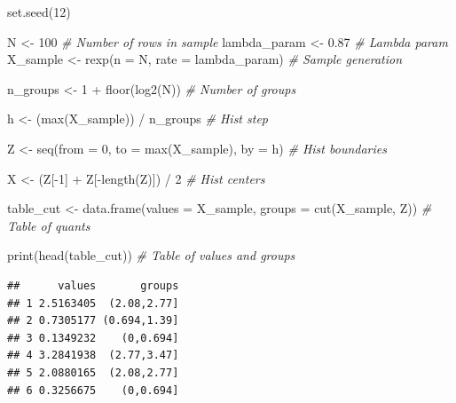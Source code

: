 \documentclass[
  14,
]{article}
\newenvironment{Shaded}{\begin{snugshade}}{\end{snugshade}}
\newcommand{\AttributeTok}[1]{\textcolor[rgb]{0.77,0.63,0.00}{#1}}
\newcommand{\CommentTok}[1]{\textcolor[rgb]{0.56,0.35,0.01}{\textit{#1}}}
\newcommand{\DecValTok}[1]{\textcolor[rgb]{0.00,0.00,0.81}{#1}}
\newcommand{\FloatTok}[1]{\textcolor[rgb]{0.00,0.00,0.81}{#1}}
\newcommand{\FunctionTok}[1]{\textcolor[rgb]{0.00,0.00,0.00}{#1}}
\newcommand{\NormalTok}[1]{#1}
\newcommand{\OtherTok}[1]{\textcolor[rgb]{0.56,0.35,0.01}{#1}}
\newcommand{\SpecialCharTok}[1]{\textcolor[rgb]{0.00,0.00,0.00}{#1}}
\begin{document}
\begin{Shaded}
\begin{Highlighting}[]
\FunctionTok{set.seed}\NormalTok{(}\DecValTok{12}\NormalTok{)}

\NormalTok{N }\OtherTok{\textless{}{-}} \DecValTok{100}                                        \CommentTok{\# Number of rows in sample}
\NormalTok{lambda\_param }\OtherTok{\textless{}{-}} \FloatTok{0.87}                                \CommentTok{\# Lambda param}
\NormalTok{X\_sample }\OtherTok{\textless{}{-}} \FunctionTok{rexp}\NormalTok{(}\AttributeTok{n =}\NormalTok{ N, }\AttributeTok{rate =}\NormalTok{ lambda\_param)        }\CommentTok{\# Sample generation}

\NormalTok{n\_groups }\OtherTok{\textless{}{-}} \DecValTok{1} \SpecialCharTok{+} \FunctionTok{floor}\NormalTok{(}\FunctionTok{log2}\NormalTok{(N))                      }\CommentTok{\# Number of groups}

\NormalTok{h }\OtherTok{\textless{}{-}}\NormalTok{ (}\FunctionTok{max}\NormalTok{(X\_sample)) }\SpecialCharTok{/}\NormalTok{ n\_groups                     }\CommentTok{\# Hist step}

\NormalTok{Z }\OtherTok{\textless{}{-}} \FunctionTok{seq}\NormalTok{(}\AttributeTok{from =} \DecValTok{0}\NormalTok{,}
         \AttributeTok{to =} \FunctionTok{max}\NormalTok{(X\_sample),}
         \AttributeTok{by =}\NormalTok{ h)                                    }\CommentTok{\# Hist boundaries}

\NormalTok{X }\OtherTok{\textless{}{-}}\NormalTok{ (Z[}\SpecialCharTok{{-}}\DecValTok{1}\NormalTok{] }\SpecialCharTok{+}\NormalTok{ Z[}\SpecialCharTok{{-}}\FunctionTok{length}\NormalTok{(Z)]) }\SpecialCharTok{/} \DecValTok{2}                    \CommentTok{\# Hist centers}

\NormalTok{table\_cut }\OtherTok{\textless{}{-}} \FunctionTok{data.frame}\NormalTok{(}\AttributeTok{values =}\NormalTok{ X\_sample, }
                        \AttributeTok{groups =} \FunctionTok{cut}\NormalTok{(X\_sample, Z)) }\CommentTok{\# Table of quants}

\FunctionTok{print}\NormalTok{(}\FunctionTok{head}\NormalTok{(table\_cut))                             }\CommentTok{\# Table of values and groups}
\end{Highlighting}
\end{Shaded}

\begin{verbatim}
##      values       groups
## 1 2.5163405  (2.08,2.77]
## 2 0.7305177 (0.694,1.39]
## 3 0.1349232    (0,0.694]
## 4 3.2841938  (2.77,3.47]
## 5 2.0880165  (2.08,2.77]
## 6 0.3256675    (0,0.694]
\end{verbatim}
\end{document}
